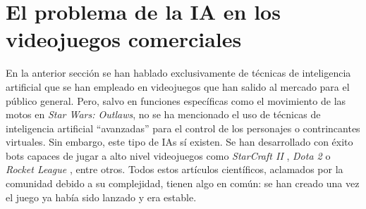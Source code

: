


\section{El problema de la IA en los videojuegos comerciales} \label{sec:problema_ia_videojuegos}

En la anterior sección se han hablado exclusivamente de técnicas de inteligencia artificial que se han empleado en videojuegos que han salido al mercado para el público general. Pero, salvo en funciones específicas como el movimiento de las motos en \textit{Star Wars: Outlaws}, no se ha mencionado el uso de técnicas de inteligencia artificial ``avanzadas'' para el control de los personajes o contrincantes virtuales. Sin embargo, este tipo de IAs sí existen. Se han desarrollado con éxito bots capaces de jugar a alto nivel videojuegos como \textit{StarCraft II} \cite{vinyals_grandmaster_2019}, \textit{Dota 2} \cite{openai_dota_2019} o \textit{Rocket League} \cite{moschopoulos_lucy-skg_2023}, entre otros. Todos estos artículos científicos, aclamados por la comunidad debido a su complejidad, tienen algo en común: se han creado una vez el juego ya había sido lanzado y era estable.

